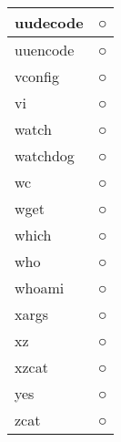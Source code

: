 \begin{longtable}{p{60mm}p{60mm}}
uudecode & ○ \\ \hline
uuencode & ○ \\ \hline
vconfig & ○ \\ \hline
vi & ○ \\ \hline
watch & ○ \\ \hline
watchdog & ○ \\ \hline
wc & ○ \\ \hline
wget & ○ \\ \hline
which & ○ \\ \hline
who & ○ \\ \hline
whoami & ○ \\ \hline
xargs & ○ \\ \hline
xz & ○ \\ \hline
xzcat & ○ \\ \hline
yes & ○ \\ \hline
zcat & ○ \\ \hline
\end{longtable}
















